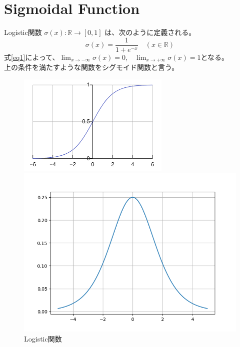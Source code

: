 \documentclass[a4paper]{jsarticle}%
\begin{document}
\section{\textbf{Sigmoidal Function}}
\thispagestyle{plain}
\begin{dfn}[シグモイド関数]
Logistic関数 $\sigma(x):\mathbb{R}\to [0,1] $ は、次のように定義される。
\begin{equation}
  \sigma(x) = \frac{1}{1 + e^{-x}} \quad (x \in \mathbb{R})\label{eq1}
\end{equation}
式\eqref{eq1}によって、$\displaystyle\lim_{x\to -\infty}\sigma(x)=0$,$\quad\displaystyle\lim_{x\to +\infty}\sigma(x)=1$となる。\\
上の条件を満たすような関数をシグモイド関数と言う。\\
\begin{figure}[h]
  \centering
  \begin{minipage}{0.43\columnwidth}
    \centering
    \includegraphics[width=\columnwidth]{pics/p1.2.png}
    \caption{Logistic関数}
    \label{fig:p1}
  \end{minipage}
  \hspace{5mm}
  \begin{minipage}{0.43\columnwidth}
    \centering
    \includegraphics[width=\columnwidth]{pics/p1.1.png}

\end{minipage}
\end{figure}
\end{dfn}
\end{document}
